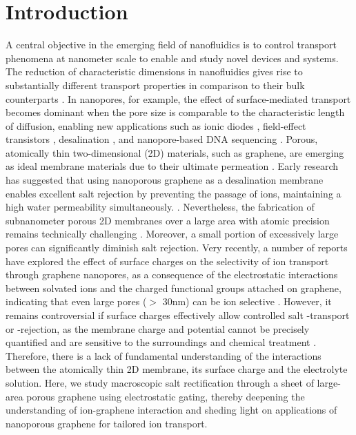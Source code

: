\documentclass[journal=langd5,email=true, hyperref=true, keywords=false]{achemso}
\begin{document}
\section{Introduction}
\label{sec:intro}
A central objective in the emerging field of nanofluidics is to
control transport phenomena at nanometer scale to enable and study novel
devices and systems. The reduction of characteristic
dimensions in nanofluidics gives rise to substantially different
transport properties in comparison to their bulk counterparts
\cite{Schoch_2008}. In nanopores, for example, the effect of
surface-mediated transport becomes dominant when the pore size is
comparable to the characteristic length of diffusion, enabling new
applications such as ionic diodes \cite{Karnik_2007}, field-effect
transistors \cite{Nam_2009}, desalination \cite{Heiranian_2015}, and
nanopore-based DNA sequencing \cite{Heerema_2016,Garaj_2013}. Porous,
atomically thin two-dimensional (2D) materials, such as graphene, are
emerging as ideal membrane materials due to their ultimate permeation
\cite{Suk_2010,Jiang_2009,Celebi_2014,Koenig_2012,Drahushuk_2012}. Early
research has suggested that using nanoporous graphene as a
desalination membrane enables excellent salt rejection by preventing
the passage of ions, maintaining a high water permeability
simultaneously.
\cite{Cohen_Tanugi_2012,Suk_2014,Cohen_Tanugi_2014,Cohen_Tanugi_2015,O_Hern_2014,O_Hern_2015,Surwade_2015,Walker_2017,Ghosh_2018}. Nevertheless,
the fabrication of subnanometer porous 2D membranes over a large area
with atomic precision remains technically challenging
\cite{Suk_2014,Rollings_2016,O_Hern_2012,Wang_2017}. Moreover, a small
portion of excessively large pores can significantly diminish salt
rejection.  Very recently, a number of reports have explored the
effect of surface charges on the selectivity of ion transport through
graphene nanopores, as a consequence of the electrostatic interactions
between solvated ions and the charged functional groups attached on
graphene, indicating that even large pores ($>$ 30nm) can be ion selective \cite{Rollings_2016,Surwade_2014}. However, it remains
controversial if surface charges effectively allow controlled salt -transport 
or -rejection, as the membrane charge and potential cannot be
precisely quantified and are sensitive to the surroundings and
chemical treatment \cite{Li_2008}. Therefore, there is a lack of 
fundamental understanding of the interactions between the atomically
thin 2D membrane, its surface charge and the electrolyte solution. Here, we study 
macroscopic salt rectification through a sheet of large-area porous
graphene using electrostatic gating, thereby deepening the
understanding of ion-graphene interaction and sheding light on applications of
nanoporous graphene for tailored ion transport.
\end{document}
